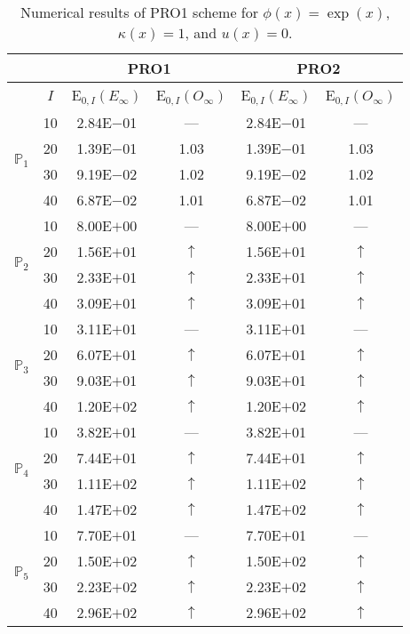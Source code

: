 \begin{table}[H]
\caption{Numerical results of PRO1 scheme for $\phi(x)=\exp(x)$, $\kappa(x)=1$, and $u(x)=0$.}
\setlength{\tabcolsep}{5pt}
\centering
\begin{tabular}{@{}l c c c c c@{}}
\toprule
 &  & \multicolumn{2}{c}{PRO1} & \multicolumn{2}{c}{PRO2}\\
\midrule
 & $I$ & E$_{0,I}(E_{\infty})$ & E$_{0,I}(O_{\infty})$ & E$_{0,I}(E_{\infty})$ & E$_{0,I}(O_{\infty})$\\
\midrule
\multirow{4}{*}{$\mathbb{P}_{1}$}
 & 10 & 2.84E$-$01 & --- & 2.84E$-$01 & ---\\
 & 20 & 1.39E$-$01 & 1.03 & 1.39E$-$01 & 1.03 \\
 & 30 & 9.19E$-$02 & 1.02 & 9.19E$-$02 & 1.02 \\
 & 40 & 6.87E$-$02 & 1.01 & 6.87E$-$02 & 1.01 \\
\midrule
\multirow{4}{*}{$\mathbb{P}_{2}$}
 & 10 & 8.00E$+$00 & --- & 8.00E$+$00 & ---\\
 & 20 & 1.56E$+$01 & $\uparrow$ & 1.56E$+$01 & $\uparrow$ \\
 & 30 & 2.33E$+$01 & $\uparrow$ & 2.33E$+$01 & $\uparrow$ \\
 & 40 & 3.09E$+$01 & $\uparrow$ & 3.09E$+$01 & $\uparrow$ \\
\midrule
\multirow{4}{*}{$\mathbb{P}_{3}$}
 & 10 & 3.11E$+$01 & --- & 3.11E$+$01 & ---\\
 & 20 & 6.07E$+$01 & $\uparrow$ & 6.07E$+$01 & $\uparrow$ \\
 & 30 & 9.03E$+$01 & $\uparrow$ & 9.03E$+$01 & $\uparrow$ \\
 & 40 & 1.20E$+$02 & $\uparrow$ & 1.20E$+$02 & $\uparrow$ \\
\midrule
\multirow{4}{*}{$\mathbb{P}_{4}$}
 & 10 & 3.82E$+$01 & --- & 3.82E$+$01 & ---\\
 & 20 & 7.44E$+$01 & $\uparrow$ & 7.44E$+$01 & $\uparrow$ \\
 & 30 & 1.11E$+$02 & $\uparrow$ & 1.11E$+$02 & $\uparrow$ \\
 & 40 & 1.47E$+$02 & $\uparrow$ & 1.47E$+$02 & $\uparrow$ \\
\midrule
\multirow{4}{*}{$\mathbb{P}_{5}$}
 & 10 & 7.70E$+$01 & --- & 7.70E$+$01 & ---\\
 & 20 & 1.50E$+$02 & $\uparrow$ & 1.50E$+$02 & $\uparrow$ \\
 & 30 & 2.23E$+$02 & $\uparrow$ & 2.23E$+$02 & $\uparrow$ \\
 & 40 & 2.96E$+$02 & $\uparrow$ & 2.96E$+$02 & $\uparrow$ \\
\bottomrule
\end{tabular}
\label{Table:PRO:Test1}
\end{table}
